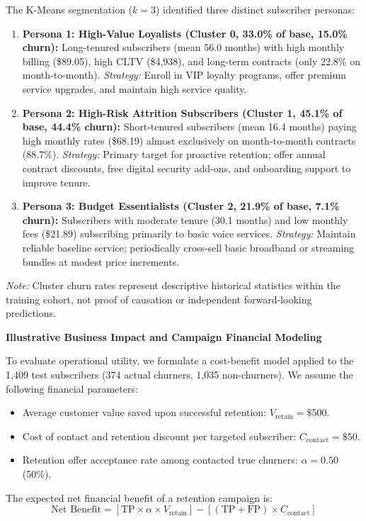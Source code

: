 \documentclass[12pt,oneside]{report}
\begin{document}
The K-Means segmentation ($k=3$) identified three distinct subscriber personas:
\begin{enumerate}
    \item \textbf{Persona 1: High-Value Loyalists (Cluster 0, 33.0\% of base, 15.0\% churn):} Long-tenured subscribers (mean 56.0 months) with high monthly billing (\$89.05), high CLTV (\$4,938), and long-term contracts (only 22.8\% on month-to-month). \textit{Strategy:} Enroll in VIP loyalty programs, offer premium service upgrades, and maintain high service quality.
    \item \textbf{Persona 2: High-Risk Attrition Subscribers (Cluster 1, 45.1\% of base, 44.4\% churn):} Short-tenured subscribers (mean 16.4 months) paying high monthly rates (\$68.19) almost exclusively on month-to-month contracts (88.7\%). \textit{Strategy:} Primary target for proactive retention; offer annual contract discounts, free digital security add-ons, and onboarding support to improve tenure.
    \item \textbf{Persona 3: Budget Essentialists (Cluster 2, 21.9\% of base, 7.1\% churn):} Subscribers with moderate tenure (30.1 months) and low monthly fees (\$21.89) subscribing primarily to basic voice services. \textit{Strategy:} Maintain reliable baseline service; periodically cross-sell basic broadband or streaming bundles at modest price increments.
\end{enumerate}
\textit{Note:} Cluster churn rates represent descriptive historical statistics within the training cohort, not proof of causation or independent forward-looking predictions.

\textbf{Illustrative Business Impact and Campaign Financial Modeling}

To evaluate operational utility, we formulate a cost-benefit model applied to the 1,409 test subscribers (374 actual churners, 1,035 non-churners). We assume the following financial parameters:
\begin{itemize}
    \item Average customer value saved upon successful retention: $V_{\text{retain}} = \$500$.
    \item Cost of contact and retention discount per targeted subscriber: $C_{\text{contact}} = \$50$.
    \item Retention offer acceptance rate among contacted true churners: $\alpha = 0.50$ (50\%).
\end{itemize}

The expected net financial benefit of a retention campaign is:
\begin{equation}
    \text{Net Benefit} = \left[ \text{TP} \times \alpha \times V_{\text{retain}} \right] - \left[ (\text{TP} + \text{FP}) \times C_{\text{contact}} \right]
\end{equation}
\end{document}
